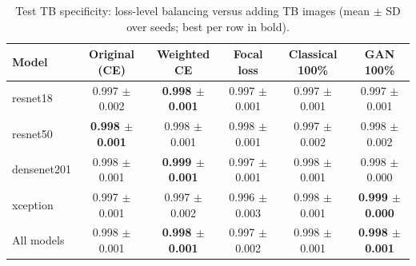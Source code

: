 \begin{table}[htbp]
\centering
\caption{Test TB specificity: loss-level balancing versus adding TB images (mean $\pm$ SD over seeds; best per row in bold).}
\label{tab:loss_tb_specificity}
\begin{tabular}{lccccc}
\toprule
Model & Original (CE) & Weighted CE & Focal loss & Classical 100\% & GAN 100\% \\
\midrule
resnet18 & 0.997 $\pm$ 0.002 & \textbf{0.998 $\pm$ 0.001} & 0.997 $\pm$ 0.001 & 0.997 $\pm$ 0.001 & 0.997 $\pm$ 0.001 \\
resnet50 & \textbf{0.998 $\pm$ 0.001} & 0.998 $\pm$ 0.001 & 0.998 $\pm$ 0.001 & 0.997 $\pm$ 0.002 & 0.998 $\pm$ 0.002 \\
densenet201 & 0.998 $\pm$ 0.001 & \textbf{0.999 $\pm$ 0.001} & 0.997 $\pm$ 0.001 & 0.998 $\pm$ 0.001 & 0.998 $\pm$ 0.000 \\
xception & 0.997 $\pm$ 0.001 & 0.997 $\pm$ 0.002 & 0.996 $\pm$ 0.003 & 0.998 $\pm$ 0.001 & \textbf{0.999 $\pm$ 0.000} \\
\midrule
All models & 0.998 $\pm$ 0.001 & \textbf{0.998 $\pm$ 0.001} & 0.997 $\pm$ 0.002 & 0.998 $\pm$ 0.001 & \textbf{0.998 $\pm$ 0.001} \\
\bottomrule
\end{tabular}
\end{table}